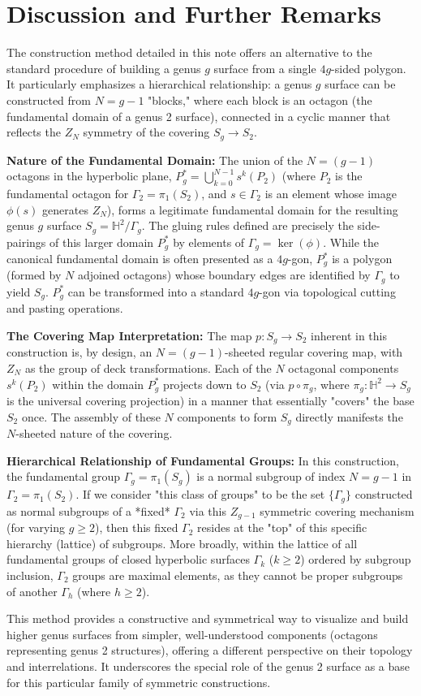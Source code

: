 \documentclass{article}
\theoremstyle{definition}
\theoremstyle{remark}
\begin{document}
\section{Discussion and Further Remarks}
The construction method detailed in this note offers an alternative to the standard procedure of building a genus $g$ surface from a single $4g$-sided polygon. It particularly emphasizes a hierarchical relationship: a genus $g$ surface can be constructed from $N=g-1$ "blocks," where each block is an octagon (the fundamental domain of a genus 2 surface), connected in a cyclic manner that reflects the $Z_N$ symmetry of the covering $S_g \to S_2$.

\textbf{Nature of the Fundamental Domain:}
The union of the $N=(g-1)$ octagons in the hyperbolic plane, $P_g^* = \bigcup_{k=0}^{N-1} s^k(P_2)$ (where $P_2$ is the fundamental octagon for $\Gamma_2 = \pi_1(S_2)$, and $s \in \Gamma_2$ is an element whose image $\phi(s)$ generates $Z_N$), forms a legitimate fundamental domain for the resulting genus $g$ surface $S_g = \mathbb{H}^2/\Gamma_g$. The gluing rules defined are precisely the side-pairings of this larger domain $P_g^*$ by elements of $\Gamma_g = \ker(\phi)$. While the canonical fundamental domain is often presented as a $4g$-gon, $P_g^*$ is a polygon (formed by $N$ adjoined octagons) whose boundary edges are identified by $\Gamma_g$ to yield $S_g$. $P_g^*$ can be transformed into a standard $4g$-gon via topological cutting and pasting operations.

\textbf{The Covering Map Interpretation:}
The map $p: S_g \to S_2$ inherent in this construction is, by design, an $N=(g-1)$-sheeted regular covering map, with $Z_N$ as the group of deck transformations. Each of the $N$ octagonal components $s^k(P_2)$ within the domain $P_g^*$ projects down to $S_2$ (via $p \circ \pi_g$, where $\pi_g: \mathbb{H}^2 \to S_g$ is the universal covering projection) in a manner that essentially "covers" the base $S_2$ once. The assembly of these $N$ components to form $S_g$ directly manifests the $N$-sheeted nature of the covering.

\textbf{Hierarchical Relationship of Fundamental Groups:}
In this construction, the fundamental group $\Gamma_g = \pi_1(S_g)$ is a normal subgroup of index $N=g-1$ in $\Gamma_2 = \pi_1(S_2)$. If we consider "this class of groups" to be the set $\{\Gamma_g\}$ constructed as normal subgroups of a *fixed* $\Gamma_2$ via this $Z_{g-1}$ symmetric covering mechanism (for varying $g \ge 2$), then this fixed $\Gamma_2$ resides at the "top" of this specific hierarchy (lattice) of subgroups. More broadly, within the lattice of all fundamental groups of closed hyperbolic surfaces $\Gamma_k$ ($k \ge 2$) ordered by subgroup inclusion, $\Gamma_2$ groups are maximal elements, as they cannot be proper subgroups of another $\Gamma_h$ (where $h \ge 2$).

This method provides a constructive and symmetrical way to visualize and build higher genus surfaces from simpler, well-understood components (octagons representing genus 2 structures), offering a different perspective on their topology and interrelations. It underscores the special role of the genus 2 surface as a base for this particular family of symmetric constructions.
\end{document}
